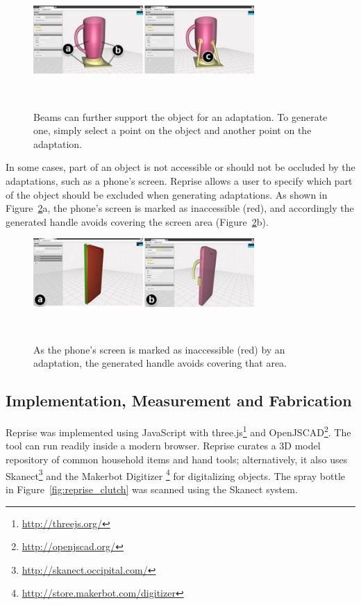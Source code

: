 \begin{figure}[h!]
  \vskip 8pt
  \centering
  \includegraphics[width=0.75\textwidth]{figures/reprise_beams_v1.pdf}
  \caption{Beams can further support the object for an adaptation. To generate one, simply select a point on the object and another point on the adaptation.}~\label{fig:reprise_beams}
\end{figure}

In some cases, part of an object is not accessible or should not be occluded by the adaptations, such as a phone's screen. Reprise allows a user to specify which part of the object should be excluded when generating adaptations. As shown in Figure~\ref{fig:reprise_inaccessible}a, the phone's screen is marked as inaccessible (red), and accordingly the generated handle avoids covering the screen area (Figure~\ref{fig:reprise_inaccessible}b).

\begin{figure}[h!]
  \vskip 7pt
	\centering
	\includegraphics[width=0.75\textwidth]{figures/reprise_inaccessible_v1.pdf}
	\caption{As the phone's screen is marked as inaccessible (red) by an adaptation, the generated handle avoids covering that area.}~\label{fig:reprise_inaccessible}
\end{figure}

\subsection{Implementation, Measurement and Fabrication}
Reprise was implemented using JavaScript with three.js\footnote{\url{http://threejs.org/}} and OpenJSCAD\footnote{\url{http://openjscad.org/}}. The tool can run readily inside a modern browser. Reprise curates a 3D model repository of common household items and hand tools; alternatively, it also uses Skanect\footnote{\url{http://skanect.occipital.com/}} and the Makerbot Digitizer \footnote{\url{http://store.makerbot.com/digitizer}} for digitalizing objects. The spray bottle in Figure~\ref{fig:reprise_clutch} was scanned using the Skanect system.

